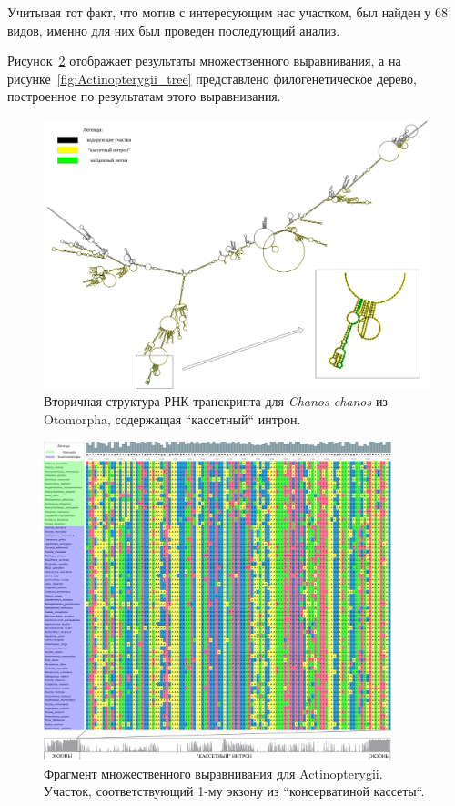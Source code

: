 Учитывая тот факт, что мотив с интересующим нас участком, был найден у 68 видов, именно для них был проведен последующий анализ.

Рисунок~\ref{fig:Actinopterygii_alignment_ruler} отображает результаты множественного выравнивания, а на рисунке~\ref{fig:Actinopterygii_tree} представлено филогенетическое дерево, построенное по результатам этого выравнивания.

\begin{figure}
    \centering
    \includegraphics[width=0.9\textheight]{images/Chanos_chanos_2nd_structure}
    \caption{Вторичная структура РНК-транскрипта для \textit{Chanos chanos} из Otomorpha, содержащая ``кассетный`` интрон.}
    \label{fig:Chanos_chanos_2nd_structure}
\end{figure}

\begin{figure}[ht] %
    \centering
    \includegraphics[width=0.9\textwidth]{images/Actinopterygii_alignment_ruler}
    \caption{Фрагмент множественного выравнивания для Actinopterygii. Участок, соответствующий 1-му экзону из ``консерватиной кассеты``.}
    \label{fig:Actinopterygii_alignment_ruler}
\end{figure}

